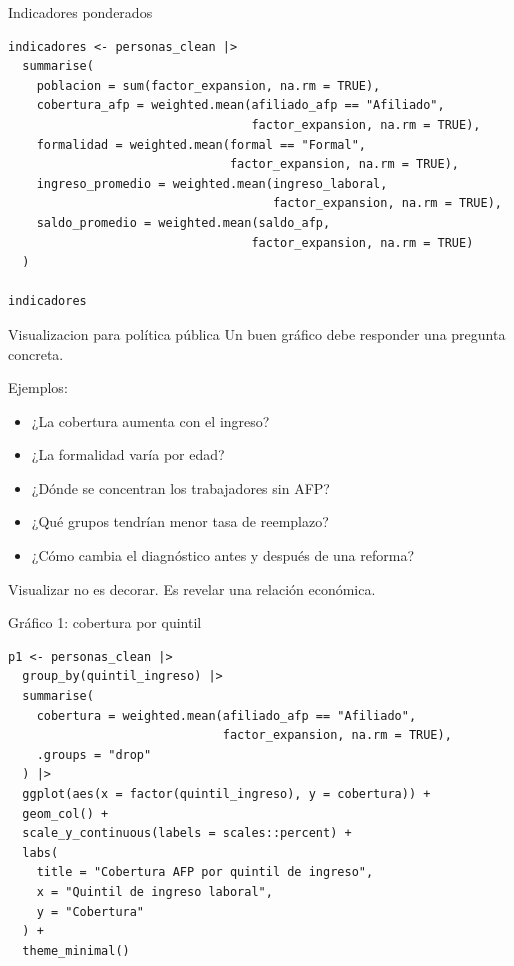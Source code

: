 \documentclass[aspectratio=169,11pt]{beamer}
\begin{document}
\begin{frame}[fragile]{Indicadores ponderados}
\begin{lstlisting}
indicadores <- personas_clean |>
  summarise(
    poblacion = sum(factor_expansion, na.rm = TRUE),
    cobertura_afp = weighted.mean(afiliado_afp == "Afiliado",
                                  factor_expansion, na.rm = TRUE),
    formalidad = weighted.mean(formal == "Formal",
                               factor_expansion, na.rm = TRUE),
    ingreso_promedio = weighted.mean(ingreso_laboral,
                                     factor_expansion, na.rm = TRUE),
    saldo_promedio = weighted.mean(saldo_afp,
                                  factor_expansion, na.rm = TRUE)
  )

indicadores
\end{lstlisting}
\end{frame}

\begin{frame}{Visualizacion para política pública}
Un buen gráfico debe responder una pregunta concreta.

\vspace{0.3cm}
Ejemplos:
\begin{itemize}
  \item ¿La cobertura aumenta con el ingreso?
  \item ¿La formalidad varía por edad?
  \item ¿Dónde se concentran los trabajadores sin AFP?
  \item ¿Qué grupos tendrían menor tasa de reemplazo?
  \item ¿Cómo cambia el diagnóstico antes y después de una reforma?
\end{itemize}

\vspace{0.2cm}
Visualizar no es decorar. Es revelar una relación económica.
\end{frame}

\begin{frame}[fragile]{Gráfico 1: cobertura por quintil}
\begin{lstlisting}
p1 <- personas_clean |>
  group_by(quintil_ingreso) |>
  summarise(
    cobertura = weighted.mean(afiliado_afp == "Afiliado",
                              factor_expansion, na.rm = TRUE),
    .groups = "drop"
  ) |>
  ggplot(aes(x = factor(quintil_ingreso), y = cobertura)) +
  geom_col() +
  scale_y_continuous(labels = scales::percent) +
  labs(
    title = "Cobertura AFP por quintil de ingreso",
    x = "Quintil de ingreso laboral",
    y = "Cobertura"
  ) +
  theme_minimal()
\end{lstlisting}
\end{frame}
\end{document}
